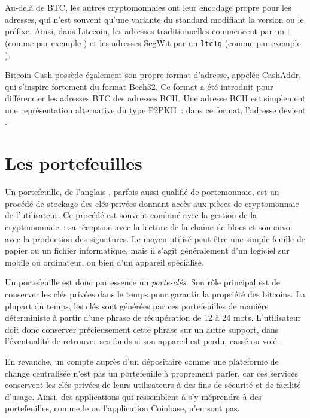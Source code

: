 Au-delà de BTC, les autres cryptomonnaies ont leur encodage propre pour les adresses, qui n'est souvent qu'une variante du standard modifiant la version ou le préfixe. Ainsi, dans Litecoin, les adresses traditionnelles commencent par un \texttt{L} (comme par exemple ) et les adresses SegWit par un \texttt{ltc1q} (comme par exemple ).

Bitcoin Cash possède également son propre format d'adresse, appelée CashAddr, qui s'inspire fortement du format Bech32. Ce format a été introduit pour différencier les adresses BTC des adresses BCH. Une adresse BCH est simplement une représentation alternative du type P2PKH~: dans ce format, l'adresse  devient .

\section*{Les portefeuilles}


Un portefeuille, de l'anglais , parfois aussi qualifié de portemonnaie, est un procédé de stockage des clés privées donnant accès aux pièces de cryptomonnaie de l'utilisateur. Ce procédé est souvent combiné avec la gestion de la cryptomonnaie~: sa réception avec la lecture de la chaîne de blocs et son envoi avec la production des signatures. Le moyen utilisé peut être une simple feuille de papier ou un fichier informatique, mais il s'agit généralement d'un logiciel sur mobile ou ordinateur, ou bien d'un appareil spécialisé.

Un portefeuille est donc par essence un \emph{porte-clés}. Son rôle principal est de conserver les clés privées dans le temps pour garantir la propriété des bitcoins. La plupart du temps, les clés sont générées par ces portefeuilles de manière déterministe à partir d'une phrase de récupération de 12 à 24 mots. L'utilisateur doit donc conserver précieusement cette phrase sur un autre support, dans l'éventualité de retrouver ses fonds si son appareil est perdu, cassé ou volé.

En revanche, un compte auprès d'un dépositaire comme une plateforme de change centralisée n'est pas un portefeuille à proprement parler, car ces services conservent les clés privées de leurs utilisateurs à des fins de sécurité et de facilité d'usage. Ainsi, des applications qui ressemblent à s'y méprendre à des portefeuilles, comme le  ou l'application Coinbase, n'en sont pas.

